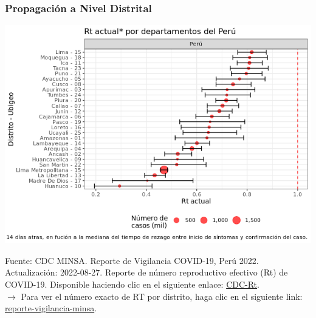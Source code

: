 \documentclass[xcolor=table]{beamer}
\begin{document}
\begin{frame}
	\frametitle{Propagación a Nivel Distrital}
	\vspace{-.5cm}
	\begin{center}
		\includegraphics[width=0.75\linewidth, trim={0cm .5cm 0cm 0.2cm},clip]{../sala_nacional/rt_cusco.png}
	\end{center}
	{\tiny Fuente: CDC MINSA. Reporte de Vigilancia COVID-19, Perú 2022. Actualización: 2022-08-27. Reporte de número reproductivo efectivo (Rt) de COVID-19. Disponible haciendo clic en el siguiente enlace: \href{https://www.dge.gob.pe/portalnuevo/informacion-publica/reporte-de-numero-reproductivo-efectivo-rt/}{CDC-Rt}. \\}
	\vspace{0.01cm}
	$\rightarrow$ Para ver el número exacto de RT por distrito, haga clic en el siguiente link: \href{https://www.dge.gob.pe/portalnuevo/informacion-publica/reporte-de-numero-reproductivo-efectivo-rt/}{\color{mycolor3}reporte-vigilancia-minsa}. \\
\end{frame}
	
\end{document}
